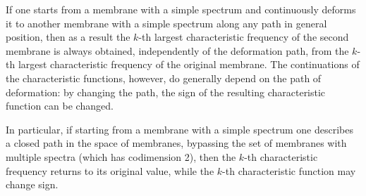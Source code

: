 If one starts from a membrane with a simple spectrum and continuously deforms it to another membrane with a simple spectrum along any path in general position, then as a result the $k$-th largest characteristic frequency of the second membrane is always obtained, independently of the deformation path, from the $k$-th largest characteristic frequency of the original membrane. The continuations of the characteristic functions, however, do generally depend on the path of deformation: by changing the path, the sign of the resulting characteristic function can be changed.

In particular, if starting from a membrane with a simple spectrum one describes a closed path in the space of membranes, bypassing the set of membranes with multiple spectra (which has codimension 2), then the $k$-th characteristic frequency returns to its original value, while the $k$-th characteristic function may change sign.
